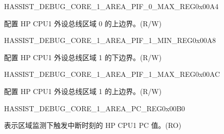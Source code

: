 \begin{register}{H}{ASSIST\_DEBUG\_CORE\_1\_AREA\_PIF\_0\_MAX\_REG}{0x00A4}\label{regdesc:ASSISTDEBUGCORE1AREAPIF0MAXREG}
%
\regnewline%
\begin{regdesc}\begin{reglist}
\label{fielddesc:ASSISTDEBUGCORE1AREAPIF0MAX}\item [ASSIST\_DEBUG\_CORE\_1\_AREA\_PIF\_0\_MAX] 配置 HP CPU1 外设总线区域 0 的上边界。(R/W)
\end{reglist}\end{regdesc}
\end{register}


\begin{register}{H}{ASSIST\_DEBUG\_CORE\_1\_AREA\_PIF\_1\_MIN\_REG}{0x00A8}\label{regdesc:ASSISTDEBUGCORE1AREAPIF1MINREG}
%
\regnewline%
\begin{regdesc}\begin{reglist}
\label{fielddesc:ASSISTDEBUGCORE1AREAPIF1MIN}\item [ASSIST\_DEBUG\_CORE\_1\_AREA\_PIF\_1\_MIN] 配置 HP CPU1 外设总线区域 1 的下边界。(R/W)
\end{reglist}\end{regdesc}
\end{register}


\begin{register}{H}{ASSIST\_DEBUG\_CORE\_1\_AREA\_PIF\_1\_MAX\_REG}{0x00AC}\label{regdesc:ASSISTDEBUGCORE1AREAPIF1MAXREG}
%
\regnewline%
\begin{regdesc}\begin{reglist}
\label{fielddesc:ASSISTDEBUGCORE1AREAPIF1MAX}\item [ASSIST\_DEBUG\_CORE\_1\_AREA\_PIF\_1\_MAX] 配置 HP CPU1 外设总线区域 1 的上边界。(R/W)
\end{reglist}\end{regdesc}
\end{register}


\begin{register}{H}{ASSIST\_DEBUG\_CORE\_1\_AREA\_PC\_REG}{0x00B0}\label{regdesc:ASSISTDEBUGCORE1AREAPCREG}
%
\regnewline%
\begin{regdesc}\begin{reglist}
\label{fielddesc:ASSISTDEBUGCORE1AREAPC}\item [ASSIST\_DEBUG\_CORE\_1\_AREA\_PC] 表示区域监测下触发中断时刻的 HP CPU1 PC 值。(RO)
\end{reglist}\end{regdesc}
\end{register}


